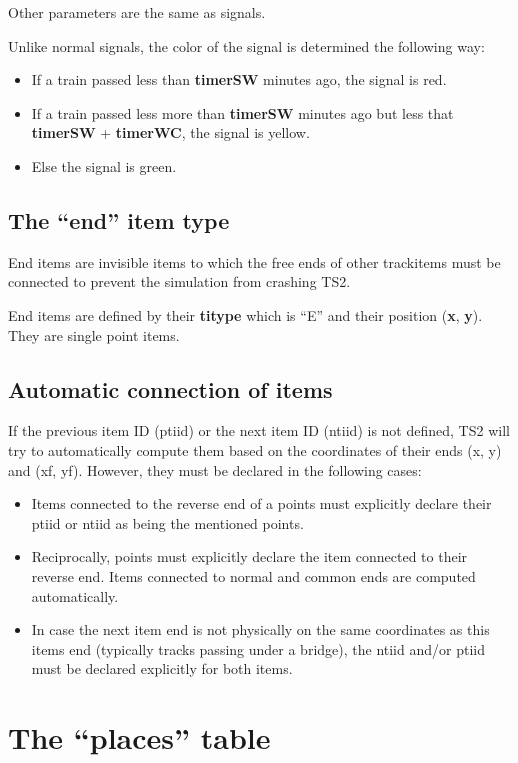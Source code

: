 \documentclass[12pt,a4paper]{article}
\begin{document}
Other parameters are the same as signals.

Unlike normal signals, the color of the signal is determined the following way:
\begin{itemize}
 \item If a train passed less than \textbf{timerSW} minutes ago, the signal is red.
 \item If a train passed less more than \textbf{timerSW} minutes ago but less that \textbf{timerSW} + \textbf{timerWC}, the signal is yellow.
 \item Else the signal is green.
\end{itemize}

\subsection{The ``end'' item type}
End items are invisible items to which the free ends of other trackitems must be connected to prevent the simulation from crashing TS2.

End items are defined by their \textbf{titype} which is ``E'' and their position (\textbf{x}, \textbf{y}). They are single point items.

\subsection{Automatic connection of items}
If the previous item ID (ptiid) or the next item ID (ntiid) is not defined, TS2 will try to automatically compute them based on the coordinates of their ends (x, y) and (xf, yf). However, they must be declared in the following cases:
\begin{itemize}
 \item Items connected to the reverse end of a points must explicitly declare their ptiid or ntiid as being the mentioned points.
 \item Reciprocally, points must explicitly declare the item connected to their reverse end. Items connected to normal and common ends are computed automatically.
 \item In case the next item end is not physically on the same coordinates as this items end (typically tracks passing under a bridge), the ntiid and/or ptiid must be declared explicitly for both items.
\end{itemize}


\section{The ``places'' table}
\end{document}
